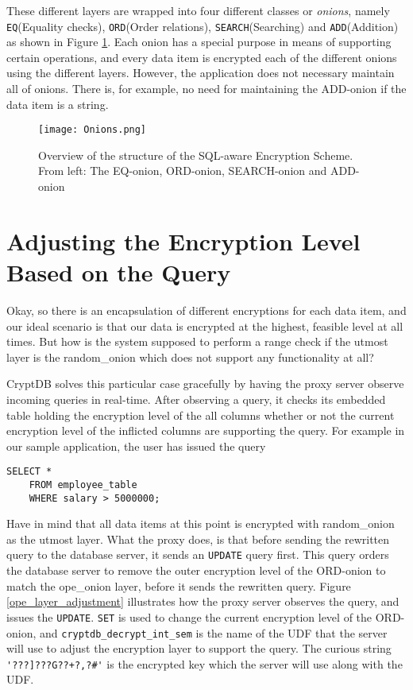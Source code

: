 These different layers are wrapped into four different classes or \emph{onions}, namely \texttt{EQ}(Equality checks), \texttt{ORD}(Order relations), \texttt{SEARCH}(Searching) and \texttt{ADD}(Addition) as shown in Figure \ref{cryptdb_onions}. Each onion has a special purpose in means of supporting certain operations, and every data item is encrypted each of the different onions using the different layers. However, the application does not necessary maintain all of onions. There is, for example, no need for maintaining the ADD-onion if the data item is a string.

\begin{figure}[H]
	\texttt{[image: Onions.png]}
	\caption{Overview of the structure of the SQL-aware Encryption Scheme. From left: The EQ-onion, ORD-onion, SEARCH-onion and ADD-onion}
	\label{cryptdb_onions}
\end{figure}


\section{Adjusting the Encryption Level Based on the Query}
\label{adjust_enc_level}

Okay, so there is an encapsulation of different encryptions for each data item, and our ideal scenario is that our data is encrypted at the highest, feasible level at all times.  But how is the system supposed to perform a range check if the utmost layer is the \gls{random_onion} which does not support any functionality at all?

CryptDB solves this particular case gracefully by having the proxy server observe incoming queries in real-time. After observing a query, it checks its embedded table holding the encryption level of the all columns whether or not the current encryption level of the inflicted columns are supporting the query. For example in our sample application, the user has issued the query 
\begin{verbatim}
SELECT *
	FROM employee_table
	WHERE salary > 5000000;
\end{verbatim}

Have in mind that all data items at this point is encrypted with \gls{random_onion} as the utmost layer. What the proxy does, is that before sending the rewritten query to the database server, it sends an \verb!UPDATE! query first. This query orders the database server to remove the outer encryption level of the ORD-onion to match the \gls{ope_onion} layer, before it sends the rewritten query. Figure \ref{ope_layer_adjustment} illustrates how the proxy server observes the query, and issues the \verb!UPDATE!. \verb!SET! is used to change the current encryption level of the ORD-onion, and \verb!cryptdb_decrypt_int_sem! is the name of the UDF that the server will use to adjust the encryption layer to  support the query. The curious string \verb!'???]???G??+?,?#'! is the encrypted key which the server will use along with the UDF.

